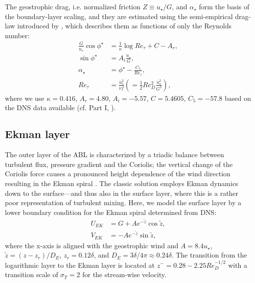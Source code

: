 \documentclass[draft,a4paper,11pt]{article}
\begin{document}
The geostrophic drag, i.e. normalized friction $Z\equiv u_\star/G$, and $\alpha_\star$ form the basis of the boundary-layer scaling, and they are estimated using the semi-empirical drag-law introduced by \cite{spalart1989theoretical}, which describes them as functions of only the Reynolds number:
\begin{subequations}\label{eqn:drag}
	\begin{align}
		\frac{G}{u_\star}\cos\phi^\star &= \frac{1}{\kappa}\log Re_\tau + C - A_r, \\
		\sin\phi^\star &= A_i\frac{u_\star}{G},\\
		\alpha_\star &= \phi^\star - \frac{C_5}{Re_\tau},\\
		Re_\tau &= \frac{u_\star^2}{\nu f} \left( = \frac{1}{2} Re_{D}^2 \frac{u_{\star}^2}{G^2}\right),
	\end{align}
\end{subequations}
where we use $\kappa = 0.416$, $A_r = 4.80$, $A_i = -5.57$, $C = 5.4605$, $C_5 = -57.8$ based on the DNS data available (cf. Part I, \cite{ansorge2014global}).



\subsection{Ekman layer}
\label{sec:ekmanlayer}
The outer layer of the ABL is characterized by a triadic balance between turbulent flux, pressure gradient and the Coriolis; the vertical change of the Coriolis force causes a pronounced height dependence of the wind direction resulting in the Ekman spiral \citep{ekman:AMA1905}. The classic solution employs Ekman dynamics down to the surface---and thus also in the surface layer, where this is a rather poor representation of turbulent mixing. Here, we model the surface layer by a lower boundary condition for the Ekman spiral determined from DNS:
\begin{subequations}
  \begin{align}
    U_{EK} &= G + Ae^{-\tilde{z}}\cos\tilde{z},\\
		V_{EK} &= - Ae^{-\tilde{z}}\sin\tilde{z},
  \end{align}
\end{subequations}
where the x-axis is aligned with the geostrophic wind and $A = 8.4u_\star$, $\tilde{z} = (z-z_r)/D_E$, $z_r = 0.12\delta$, and $D_E = 3\delta/4\pi\approx 0.24\delta$. The transition from the logarithmic layer to the Ekman layer is located at $z^{-}=0.28- 2.25 Re_{D}^{-1/2}$ with a transition scale of $\sigma_T=2$ for the stream-wise velocity.
\end{document}

